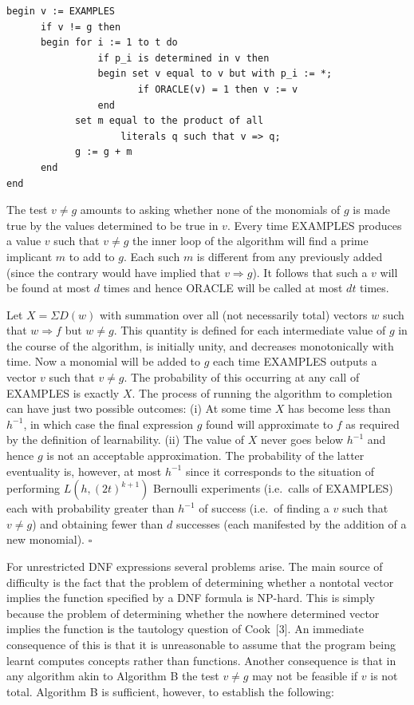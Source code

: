 \begin{verbatim}
begin v := EXAMPLES
      if v != g then
      begin for i := 1 to t do
                if p_i is determined in v then
                begin set v equal to v but with p_i := *;
                       if ORACLE(v) = 1 then v := v
                end
            set m equal to the product of all
                    literals q such that v => q;
            g := g + m
      end
end
\end{verbatim}

The test $v \neq g$ amounts to asking whether
none of the monomials of $g$ is made true by the
values determined to be true in $v$. Every time
EXAMPLES produces a value $v$ such that $v \neq g$ the
inner loop of the algorithm will find a prime implicant $m$ to add to $g$. Each such $m$ is
different from any previously added (since the
contrary would have implied that $v \Rightarrow g$). It
follows that such a $v$ will be found at most $d$
times and hence ORACLE will be called at most $dt$
times.

Let $X = \Sigma D(w)$ with summation over all (not
necessarily total) vectors $w$ such that $w \Rightarrow f$
but $w \neq g$. This quantity is defined for each
intermediate value of $g$ in the course of the
algorithm, is initially unity, and decreases monotonically with time. Now a monomial will be added
to $g$ each time EXAMPLES outputs a vector $v$ such
that $v \neq g$. The probability of this occurring at
any call of EXAMPLES is exactly $X$. The process
of running the algorithm to completion can have
just two possible outcomes: (i) At some time $X$
has become less than $h^{-1}$, in which case the final
expression $g$ found will approximate to $f$ as
required by the definition of learnability.
(ii) The value of $X$ never goes below $h^{-1}$ and
hence $g$ is not an acceptable approximation. The
probability of the latter eventuality is, however,
at most $h^{-1}$ since it corresponds to the situation
of performing $L(h, (2t)^{k+1})$ Bernoulli experiments
(i.e.\ calls of EXAMPLES) each with probability
greater than $h^{-1}$ of success (i.e.\ of finding a $v$
such that $v \neq g$) and obtaining fewer than $d$
successes (each manifested by the addition of a
new monomial). \hfill $\square$

\medskip

For unrestricted DNF expressions several
problems arise. The main source of difficulty is
the fact that the problem of determining whether
a nontotal vector implies the function specified by
a DNF formula is NP-hard. This is simply
because the problem of determining whether the nowhere determined vector implies the function is the
tautology question of Cook~[3]. An immediate
consequence of this is that it is unreasonable to
assume that the program being learnt computes concepts rather than functions. Another consequence
is that in any algorithm akin to Algorithm B the
test $v \neq g$ may not be feasible if $v$ is not
total. Algorithm B is sufficient, however, to
establish the following:

